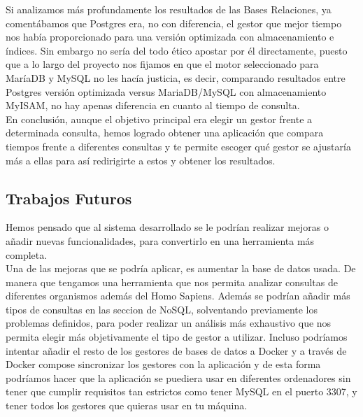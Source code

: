 \documentclass[12pt,a4paper]{article}
\begin{document}
Si analizamos más profundamente los resultados de las Bases Relaciones, ya comentábamos que Postgres era, no con diferencia, el gestor que mejor tiempo nos había proporcionado para una versión optimizada con almacenamiento e índices. Sin embargo no sería del todo ético apostar por él directamente, puesto que a lo largo del proyecto nos fijamos en que el motor seleccionado para MaríaDB y MySQL no les hacía justicia, es decir, comparando resultados entre Postgres versión optimizada versus MariaDB/MySQL con almacenamiento MyISAM, no hay apenas diferencia en cuanto al tiempo de consulta.\\

En conclusión, aunque el objetivo principal era elegir un gestor frente a determinada consulta, hemos logrado obtener una aplicación que compara tiempos frente a diferentes consultas y te permite escoger qué gestor se ajustaría más a ellas para así redirigirte a estos y obtener los resultados.\\

\subsection{Trabajos Futuros} \label{pto92}

Hemos pensado que al sistema desarrollado se le podrían realizar mejoras o añadir nuevas funcionalidades, para convertirlo en una herramienta más completa. \\

Una de las mejoras que se podría aplicar, es aumentar la base de datos usada. De manera que tengamos una herramienta que nos permita analizar consultas de diferentes organismos además del Homo Sapiens. Además se podrían añadir más tipos de consultas en las seccion de NoSQL, solventando previamente los problemas definidos, para poder realizar un análisis más exhaustivo que nos permita elegir más objetivamente el tipo de gestor a utilizar. Incluso podríamos intentar añadir el resto de los gestores de bases de datos a Docker y a través de Docker compose sincronizar los gestores con la aplicación y de esta forma podríamos hacer que la aplicación se puediera usar en diferentes ordenadores sin tener que cumplir requisitos tan estrictos como tener MySQL en el puerto 3307, y tener todos los gestores que quieras usar en tu máquina.\\



\newpage
\end{document}
